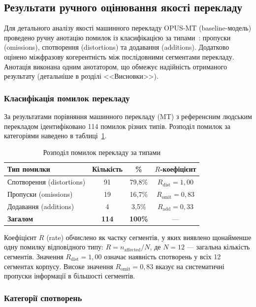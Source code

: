 \subsection{Результати ручного оцінювання якості перекладу}

Для детального аналізу якості машинного перекладу OPUS-MT (baseline-модель)
проведено ручну анотацію помилок із класифікацією за типами~\cite{mqm}:
пропуски (omissions), спотворення (distortions) та додавання (additions). Додатково оцінено
міжфразову когерентність між послідовними сегментами перекладу. Анотація
виконана одним анотатором, що обмежує надійність отриманого результату
(детальніше в розділі <<Висновки>>).

\subsubsection{Класифікація помилок перекладу}

За результатами порівняння машинного перекладу (MT) з референсним людським
перекладом ідентифіковано 114 помилок різних типів. Розподіл помилок за
категоріями наведено в таблиці~\ref{tab:error_distribution}.

\begin{table}[H]
\centering
\caption{Розподіл помилок перекладу за типами}
\label{tab:error_distribution}
\begin{tabular}{|l|c|c|c|}
\hline
\textbf{Тип помилки} & \textbf{Кількість} & \textbf{\%} & \textbf{$R$-коефіцієнт} \\
\hline
Спотворення (distortions) & 91 & 79,8\% & $R_{\text{dist}} = 1,00$ \\
Пропуски (omissions) & 19 & 16,7\% & $R_{\text{omit}} = 0,83$ \\
Додавання (additions) & 4 & 3,5\% & $R_{\text{add}} = 0,33$ \\
\hline
\textbf{Загалом} & \textbf{114} & \textbf{100\%} & --- \\
\hline
\end{tabular}
\end{table}

Коефіцієнт $R$ (rate) обчислено як частку сегментів, у яких виявлено
щонайменше одну помилку відповідного типу: $R = n_{\text{affected}} / N$,
де $N = 12$ --- загальна кількість сегментів. Значення $R_{\text{dist}} = 1,00$
означає наявність спотворень у всіх 12 сегментах корпусу. Високе значення
$R_{\text{omit}} = 0,83$ вказує на систематичні пропуски інформації в більшості
сегментів.

\subsubsection{Категорії спотворень}

